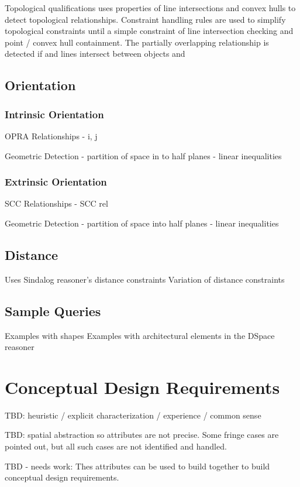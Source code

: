 \documentclass[12pt]{ucthesis}
\begin{document}
Topological qualifications uses properties of line intersections and convex hulls to detect topological relationships. Constraint handling rules are used to simplify topological constraints until a simple constraint of line intersection checking and point / convex hull containment. The partially overlapping relationship is detected if and lines intersect between objects and 

\section{Orientation}

\subsection{Intrinsic Orientation}
OPRA
Relationships
  - i, j

Geometric Detection
  - partition of space in to half planes
  - linear inequalities

\subsection{Extrinsic Orientation}
SCC
Relationships
  - SCC rel
  
Geometric Detection
  - partition of space into half planes
  - linear inequalities

\section{Distance}
Uses Sindalog reasoner's distance constraints
Variation of distance constraints

\section{Sample Queries}
Examples with shapes
Examples with architectural elements in the DSpace reasoner


\chapter{Conceptual Design Requirements}
TBD: heuristic / explicit characterization / experience / common sense

TBD: spatial abstraction so attributes are not precise. Some fringe cases are pointed out, but all such cases are not identified and handled.

TBD - needs work: Thes attributes can be used to build together to build conceptual design requirements.
\end{document}
